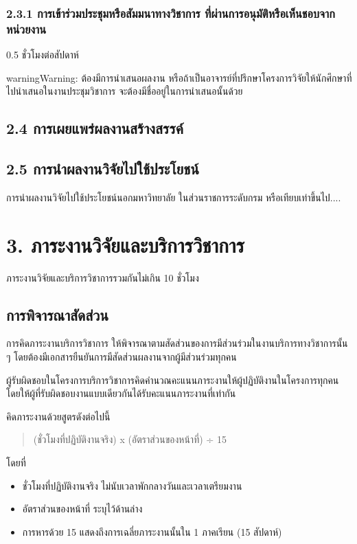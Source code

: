\documentclass[a4paper,12pt,english]{sphinxmanual}
\begin{document}
\subsection{2.3.1 การเข้าร่วมประชุมหรือสัมมนาทางวิชาการ ที่ผ่านการอนุมัติหรือเห็นชอบจากหน่วยงาน}
\label{\detokenize{2research:id10}}
0.5 ชั่วโมงต่อสัปดาห์

\begin{sphinxadmonition}{warning}{Warning:}
ต้องมีการนำเสนอผลงาน หรือถ้าเป็นอาจารย์ที่ปรึกษาโครงการวิจัยให้นักศึกษาที่ไปนำเสนอในงานประชุมวิชาการ จะต้องมีชื่ออยู่ในการนำเสนอนั้นด้วย
\end{sphinxadmonition}


\section{2.4 การเผยแพร่ผลงานสร้างสรรค์}
\label{\detokenize{2research:id11}}

\section{2.5 การนำผลงานวิจัยไปใช้ประโยชน์}
\label{\detokenize{2research:id12}}
การนำผลงานวิจัยไปใช้ประโยชน์นอกมหาวิทยาลัย ในส่วนราชการระดับกรม หรือเทียบเท่าขึ้นไป....


\chapter{3. ภาระงานวิจัยและบริการวิชาการ}
\label{\detokenize{3service:id1}}\label{\detokenize{3service::doc}}
ภาระงานวิจัยและบริการวิชาการรวมกันไม่เกิน 10 ชั่วโมง


\section{การพิจารณาสัดส่วน}
\label{\detokenize{3service:id2}}
การคิดภาระงานบริการวิชาการ ให้พิจารณาตามสัดส่วนของการมีส่วนร่วมในงานบริการทางวิชาการนั้น ๆ โดยต้องมีเอกสารยืนยันการมีสัดส่วนผลงานจากผู้มีส่วนร่วมทุกคน

ผู้รับผิดชอบในโครงการบริการวิชาการคิดคำนวณคะแนนภาระงานให้ผู้ปฏิบัติงานในโครงการทุกคน โดยให้ผู้ที่รับผิดชอบงานแบบเดียวกันได้รับคะแนนภาระงานที่เท่ากัน

คิดภาระงานด้วยสูตรดังต่อไปนี้
\begin{quote}

(ชั่วโมงที่ปฏิบัติงานจริง) x (อัตราส่วนของหน้าที่) ÷ 15
\end{quote}

โดยที่
\begin{itemize}
\item {} 
ชั่วโมงที่ปฏิบัติงานจริง ไม่นับเวลาพักกลางวันและเวลาเตรียมงาน

\item {} 
อัตราส่วนของหน้าที่ ระบุไว้ด้านล่าง

\item {} 
การหารด้วย 15 แสดงถึงการเฉลี่ยภาระงานนั้นใน 1 ภาคเรียน (15 สัปดาห์)

\end{itemize}
\end{document}
